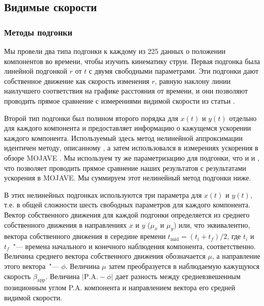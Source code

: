 \subsection{Видимые скорости}

\subsubsection{Методы подгонки}

Мы провели два типа подгонки к каждому из 225 данных о положении компонентов во времени, чтобы
изучить кинематику струи. Первая подгонка была линейной подгонкой $r$ от $t$ с двумя свободными
параметрами. Эти подгонки дают собственное движение как скорость изменения $r$, равную наклону
линии наилучшего соответствия на графике расстояния от времени, и они позволяют проводить прямое
сравнение с измерениями видимой скорости из статьи \cite{Piner_2007}.

Второй тип подгонки был полином второго порядка для $x(t)$ и $y(t)$ отдельно для каждого компонента
и предоставляет информацию о кажущемся ускорении каждого компонента. Используемый здесь метод
нелинейной аппроксимации идентичен методу, описанному \cite{Homan_2001}, а затем использовался в
измерениях ускорения в обзоре MOJAVE \cite{Lister_2009b,Homan_2009}. Мы используем ту же
параметризацию для подгонки, что и \cite{Homan_2001} и \cite{Homan_2009}, что позволяет проводить
прямое сравнение наших результатов с результатами ускорения в MOJAVE. Мы суммируем этот нелинейный
метод подгонки ниже.

В этих нелинейных подгонках используются три параметра для $x(t)$ и $y(t)$, т.\:е. в общей
сложности шесть свободных параметров для каждого компонента. Вектор собственного движения
для каждой подгонки определяется из среднего собственного движения в направлениях $x$ и $y$
($\mu_x$ и $\mu_y$) или, что эквивалентно, вектора собственного движения в середине времени
$t_\text{mid} = (t_i + t_f) / 2$, где $t_i$ и $t_f$~"--- времена начального и конечного наблюдения
компонента, соответственно. Величина среднего вектора собственного движения
обозначается $\mu$, а направление этого вектора~"--- $\phi$. Величина $\mu$ затем преобразуется в
наблюдаемую кажущуюся скорость $\beta_\text{app}$. Величина $|\text{P.A.} - \phi|$ дает разность
между средневзвешенным позиционным углом P.A. компонента и направлением вектора его средней видимой
скорости.

